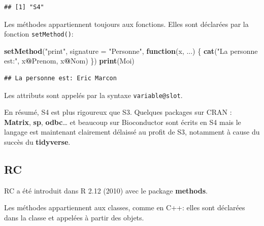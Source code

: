 \documentclass[
  12pt,
  french,
  a4paper,
  extrafontsizes,onecolumn,openright
  ]{memoir}
\newenvironment{Shaded}{\begin{snugshade}}{\end{snugshade}}
\newcommand{\ControlFlowTok}[1]{\textcolor[rgb]{0.13,0.29,0.53}{\textbf{#1}}}
\newcommand{\DataTypeTok}[1]{\textcolor[rgb]{0.13,0.29,0.53}{#1}}
\newcommand{\KeywordTok}[1]{\textcolor[rgb]{0.13,0.29,0.53}{\textbf{#1}}}
\newcommand{\NormalTok}[1]{#1}
\newcommand{\OperatorTok}[1]{\textcolor[rgb]{0.81,0.36,0.00}{\textbf{#1}}}
\newcommand{\StringTok}[1]{\textcolor[rgb]{0.31,0.60,0.02}{#1}}
\begin{document}
\begin{verbatim}
## [1] "S4"
\end{verbatim}

\normalsize

Les méthodes appartiennent toujours aux fonctions.
Elles sont déclarées par la fonction \texttt{setMethod()}:

\scriptsize

\begin{Shaded}
\begin{Highlighting}[]
\KeywordTok{setMethod}\NormalTok{(}\StringTok{"print"}\NormalTok{, }\DataTypeTok{signature =} \StringTok{"Personne"}\NormalTok{, }\ControlFlowTok{function}\NormalTok{(x, ...) \{}
    \KeywordTok{cat}\NormalTok{(}\StringTok{"La personne est:"}\NormalTok{, x}\OperatorTok{@}\NormalTok{Prenom, x}\OperatorTok{@}\NormalTok{Nom)}
\NormalTok{\})}
\KeywordTok{print}\NormalTok{(Moi)}
\end{Highlighting}
\end{Shaded}

\begin{verbatim}
## La personne est: Eric Marcon
\end{verbatim}

\normalsize

Les attributs sont appelés par la syntaxe \texttt{variable@slot}.

En résumé, S4 est plus rigoureux que S3.
Quelques packages sur CRAN : \textbf{Matrix}, \textbf{sp}, \textbf{odbc}\ldots{} et beaucoup sur Bioconductor sont écrits en S4 mais le langage est maintenant clairement délaissé au profit de S3, notamment à cause du succès du \textbf{tidyverse}.

\hypertarget{rc}{%
\subsection{RC}\label{rc}}

RC a été introduit dans R 2.12 (2010) avec le package \textbf{methods}.

Les méthodes appartiennent aux classes, comme en C++: elles sont déclarées dans la classe et appelées à partir des objets.

\scriptsize
\end{document}
